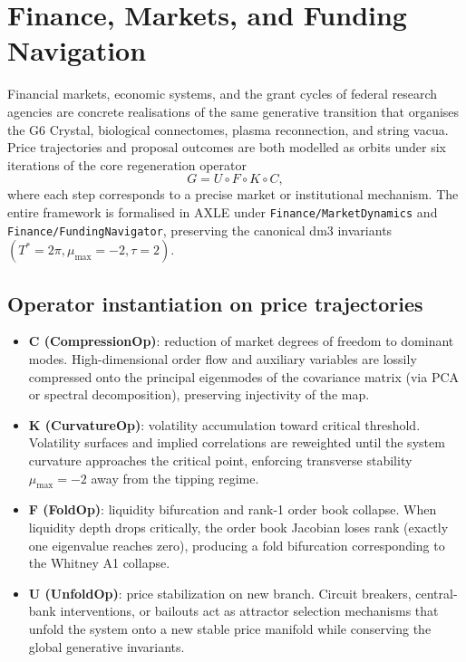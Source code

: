 \chapter{Finance, Markets, and Funding Navigation}

Financial markets, economic systems, and the grant cycles of federal research agencies are concrete realisations of the same generative transition that organises the G6 Crystal, biological connectomes, plasma reconnection, and string vacua. Price trajectories and proposal outcomes are both modelled as orbits under six iterations of the core regeneration operator
\[
G = U \circ F \circ K \circ C,
\]
where each step corresponds to a precise market or institutional mechanism. The entire framework is formalised in AXLE under \texttt{Finance/MarketDynamics} and \texttt{Finance/FundingNavigator}, preserving the canonical dm3 invariants $(T^* = 2\pi, \mu_{\max} = -2, \tau = 2)$.

\section{Operator instantiation on price trajectories}

\begin{itemize}
\item \textbf{C (CompressionOp)}: reduction of market degrees of freedom to dominant modes. High-dimensional order flow and auxiliary variables are lossily compressed onto the principal eigenmodes of the covariance matrix (via PCA or spectral decomposition), preserving injectivity of the map.
\item \textbf{K (CurvatureOp)}: volatility accumulation toward critical threshold. Volatility surfaces and implied correlations are reweighted until the system curvature approaches the critical point, enforcing transverse stability \(\mu_{\max} = -2\) away from the tipping regime.
\item \textbf{F (FoldOp)}: liquidity bifurcation and rank-1 order book collapse. When liquidity depth drops critically, the order book Jacobian loses rank (exactly one eigenvalue reaches zero), producing a fold bifurcation corresponding to the Whitney A1 collapse.
\item \textbf{U (UnfoldOp)}: price stabilization on new branch. Circuit breakers, central-bank interventions, or bailouts act as attractor selection mechanisms that unfold the system onto a new stable price manifold while conserving the global generative invariants.
\end{itemize}

